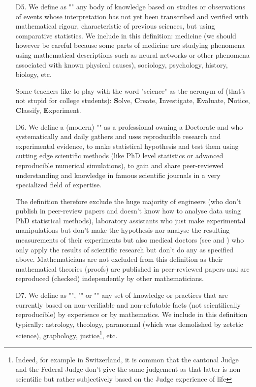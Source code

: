 \begin{itemize}
	\item[D5.] We define as "" any body of knowledge based on studies or observations of events whose interpretation has not yet been transcribed and verified with mathematical rigour, characteristic of previous sciences, but using comparative statistics. We include in this definition: medicine (we should however be careful because some parts of medicine are studying phenomena using mathematical descriptions such as neural networks or other phenomena associated with known physical causes), sociology, psychology, history, biology, etc.
	
	Some teachers like to play with the word "science" as the acronym of (that's not stupid for college students): \textbf{S}olve, \textbf{C}reate, \textbf{I}nvestigate, \textbf{E}valuate, \textbf{N}otice, \textbf{C}lassify, \textbf{E}xperiment.
	
	\item[D6.] We define a (modern) "" as a professional owning a Doctorate and who systematically and daily gathers and uses reproducible research and experimental evidence, to make statistical hypothesis and test them using cutting edge scientific methods (like PhD level statistics or advanced reproducible numerical simulations), to gain and share peer-reviewed understanding and knowledge in famous scientific journals in a very specialized field of expertise.
	
	The definition therefore exclude the huge majority of engineers (who don't publish in peer-review papers and doesn't know how to analyse data using PhD statistical methods), laboratory assistants who just make experimental manipulations but don't make the hypothesis nor analyse the resulting measurements of their experiments but also medical doctors (see \cite{smith2004doctors} and \cite{freed2004doctors}) who only apply the results of scientific research but don't do any as specified above. Mathematicians are not excluded from this definition as their mathematical theories (proofs) are published in peer-reviewed papers and are reproduced (checked) independently by other mathematicians.

	\item[D7.] We define as "", "" or "" any set of knowledge or practices that are currently based on non-verifiable and non-refutable facts (not scientifically reproducible) by experience or by mathematics. We include in this definition typically: astrology, theology, paranormal (which was demolished by zetetic science), graphology, justice\footnote{Indeed, for example in Switzerland, it is common that the cantonal Judge and the Federal Judge don't give the same judgement as that latter is non-scientific but rather subjectively based on the Judge experience of life}, etc. 
	

\end{itemize}
